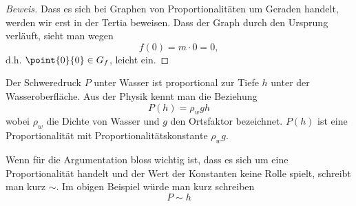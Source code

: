\documentclass[%
11pt,%
twoside,%
titlepage,%
german,%
headsepline%
]{scrartcl}
\begin{document}
\begin{proof}[Beweis]
Dass es sich bei Graphen von Proportionalit\"aten um Geraden handelt, werden wir erst in der Tertia beweisen. Dass der Graph durch den Ursprung verl\"auft, sieht man wegen
$$f(0)=m\cdot0=0,$$
d.h. $\point{0}{0}\in G_f$, leicht ein.
\end{proof}
\begin{bsp}
Der Schweredruck $P$ unter Wasser ist proportional zur Tiefe $h$ unter der Wasseroberfl\"ache. Aus der Physik kennt man die Beziehung
$$P(h)=\rho_wgh$$
wobei $\rho_w$ die Dichte von Wasser und $g$ den Ortsfaktor bezeichnet. $P(h)$ ist eine Proportionalit\"at mit Proportionalit\"atskonstante $\rho_wg$.
\end{bsp}
\begin{bem}
Wenn f\"ur die Argumentation bloss wichtig ist, dass es sich um eine Proportionalit\"at handelt und der Wert der Konstanten keine Rolle spielt, schreibt man kurz \glqq$\sim$\grqq. Im obigen Beispiel w\"urde man kurz schreiben
$$P\sim h$$
\end{bem}
\end{document}

